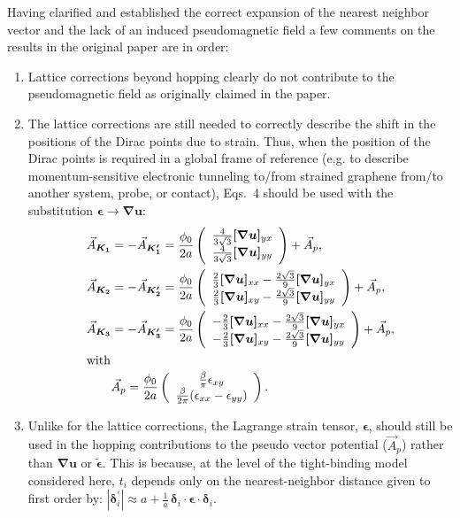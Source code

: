 Having clarified and established the correct expansion of the nearest neighbor vector and the lack of an induced pseudomagnetic field a few comments on the results in the original paper are in order:
%
\begin{enumerate} \renewcommand{\theenumi}{\roman{enumi}}
  \item Lattice corrections beyond hopping clearly do not contribute to the pseudomagnetic field as originally claimed in the paper.
  \item The lattice corrections are still needed to correctly describe the shift in the positions of the Dirac points due to strain. Thus, when the position of the Dirac points is required in a global frame of reference (e.g. to describe momentum-sensitive electronic tunneling to/from strained graphene from/to another system, probe, or contact), Eqs.~4 should be used with the substitution $\bm{\epsilon } \to \bm{\nabla u}$:
%
	\begin{align*}
	\vec{A}_{\bm{K_1}}&=-\vec{A}_{\bm{K_1'}}=\frac{\phi_0}{2a} \left(
\begin{array}{c} \frac{4}{3\sqrt{3}}\bm{[\nabla u]}_{yx}\\ \frac{4}{3
\sqrt{3}} \bm{[\nabla u]}_{yy} \end{array} \right) +\vec{A}_p , \\ 
	\vec{A}_{\bm{K_2}}&=-\vec{A}_{\bm{K_2'}}=\frac{\phi_0}{2a} \left(
\begin{array}{c} \frac{2}{3}\bm{[\nabla u]}_{xx}-\frac{2\sqrt{3}}{9}
\bm{[\nabla u]}_{yx} \\ \frac{2}{3} \bm{[\nabla u]}_{xy}-\frac{2
\sqrt{3}}{9} \bm{[\nabla u]}_{yy} \end{array} \right)+\vec{A}_p  ,  \\
	\vec{A}_{\bm{K_3}}&=-\vec{A}_{\bm{K_3'}}=\frac{\phi_0}{2a} \left(
\begin{array}{c} -\frac{2}{3} \bm{[\nabla u]}_{xx}-\frac{2
\sqrt{3}}{9} \bm{[\nabla u]}_{yx} \\ -\frac{2}{3} \bm{[\nabla
u]}_{xy}-\frac{2 \sqrt{3}}{9} \bm{[\nabla u]}_{yy} \end{array}
\right)+\vec{A}_p  , \\
	\intertext{with}
	&\vec{A}_p=\frac{\phi_0}{2a} \left( \begin{array}{c} \frac{\beta }{\pi} \epsilon_{xy} \\ \frac{\beta }{2 \pi} (\epsilon_{xx}-\epsilon_{yy}) \end{array} \right).
	\end{align*}
%
  \item Unlike for the lattice corrections, the Lagrange strain tensor, $\bm{\epsilon}$, should still be used in the hopping contributions to the pseudo vector potential ($\vec{A}_p$) rather than $\bm{\nabla u}$ or $\tilde{\bm{\epsilon}}$. This is because, at the level of the tight-binding model considered here, $t_i$ depends only on the nearest-neighbor distance given to first order by: $|\bm{\delta}_{i}^{\prime}|\approx a+\frac{1}{a}\,\bm{\delta}_{i}\cdot\bm{\epsilon}\cdot\bm{\delta}_ {i}$.

\end{enumerate}

